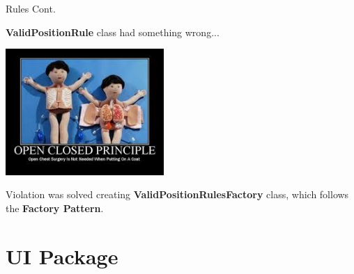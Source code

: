 \documentclass{beamer}
\begin{document}
  \begin{frame} {Rules Cont.}

    \textbf{ValidPositionRule} class had something wrong...

    \vspace{1em}


    \pause
    \hfill
    \includegraphics[width=0.45\textwidth]{img/openclosedprinciple.jpeg}

    \pause

    \vspace{1em}

    Violation was solved creating \textbf{ValidPositionRulesFactory} class, which follows the \textbf{Factory Pattern}.

  \end{frame}



\section{UI Package}
\end{document}
